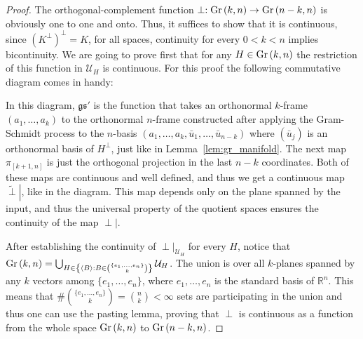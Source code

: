 \begin{proof} The orthogonal-complement function $\perp:\Gr{k}{n}\to\Gr{n-k}{n}$ is obviously one to one and onto. Thus, it suffices to show that it is continuous, since ${\left(K^{\perp}\right)}^{\perp}=K$, for all spaces, continuity for every $0<k<n$ implies bicontinuity. We are going to prove first that for any $H\in\Gr{k}{n}$ the restriction of this function in $\mathcal{U}_H$ is continuous. For this proof the following commutative diagram comes in handy:
\begin{center}
\end{center}
In this diagram, $\mathfrak{gs}'$ is the function that takes an orthonormal $k$-frame $(a_1,\ldots,a_k)$ to the orthonormal $n$-frame constructed after applying the Gram-Schmidt process to the $n$-basis $\left(a_1,\ldots,a_k,\bar{u}_1,\ldots,\bar{u}_{n-k}\right)$ where $\left(\bar{u}_j\right)$ is an orthonormal basis of $H^{\perp}$, just like in Lemma~\ref{lem:gr_manifold}. The next map $\pi_{[k+1,n]}$ is just the orthogonal projection in the last $n-k$ coordinates. Both of these maps are continuous and well defined, and thus we get a continuous map $\left.\tilde{\perp}\right|$, like in the diagram. This map depends only on the plane spanned by the input, and thus the universal property of the quotient spaces ensures the continuity of the map $\left.\perp\right|$.

After establishing the continuity of $\left.\perp\right|_{\mathcal{U}_H}$ for every $H$, notice that
$\Gr{k}{n} = \bigcup_{H\in\left\{\left<B\right>:B\in\binom{\{e_1,\ldots,e_n\}}{k}\right\}}\mathcal{U}_H$.
The union is over all $k$-planes spanned by any $k$ vectors among $\{e_1,\ldots,e_n\}$, where $e_1,\ldots,e_n$ is the standard basis of $\mathbb{R}^n$. This means that $\#\binom{\{e_1,\ldots,e_n\}}{k}=\binom{n}{k}<\infty$ sets are participating in the union and thus one can use the pasting lemma, proving that $\perp$ is continuous as a function from the whole space $\Gr{k}{n}$ to $\Gr{n-k}{n}$.
\end{proof}

